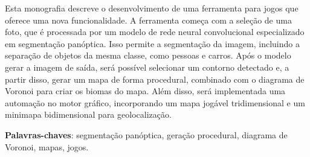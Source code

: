 \documentclass[
	12pt,				%
	openright,			%
	twoside,			%
	a4paper,			%
	english,			%
	french,				%
	spanish,			%
	brazil				%
	]{abntex2}
\begin{document}





\setlength{\absparsep}{18pt} %
\begin{resumo}
  Esta monografia descreve o desenvolvimento de uma ferramenta para jogos que oferece uma nova funcionalidade. A ferramenta começa com a seleção de uma foto, que é processada por um modelo de rede neural convolucional especializado em segmentação panóptica. Isso permite a segmentação da imagem, incluindo a separação de objetos da mesma classe, como pessoas e carros. Após o modelo gerar a imagem de saída, será possível selecionar um contorno detectado e, a partir disso, gerar um mapa de forma procedural, combinado com o diagrama de Voronoi para criar os biomas do mapa. Além disso, será implementada uma automação no motor gráfico, incorporando um mapa jogável tridimensional e um minimapa bidimensional para geolocalização.

 \textbf{Palavras-chaves}: segmentação panóptica, geração procedural, diagrama de Voronoi, mapas, jogos.
\end{resumo}
\end{document}
